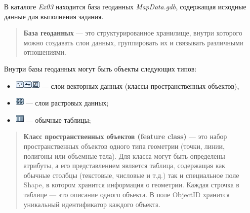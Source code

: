\documentclass[]{book}
\providecommand{\tightlist}{%
  \setlength{\itemsep}{0pt}\setlength{\parskip}{0pt}}
\theoremstyle{definition}
\theoremstyle{definition}
\theoremstyle{definition}
\theoremstyle{remark}
\begin{document}
В каталоге \emph{Ex03} находится база геоданных \emph{MapData.gdb},
содержащая исходные данные для выполнения задания.

\begin{quote}
\textbf{База геоданных} --- это структурированное хранилище, внутри
которого можно создавать слои данных, группировать их и связывать
различными отношениями.
\end{quote}

Внутри базы геоданных могут быть объекты следующих типов:

\begin{itemize}
\tightlist
\item
  \includegraphics{images/Ex03/image7.png}\includegraphics{images/Ex03/image8.png}\includegraphics{images/Ex03/image9.png}
  --- слои векторных данных (классы пространственных объектов),
\item
  \includegraphics{images/Ex03/image10.png} --- слои растровых данных;
\item
  \includegraphics{images/Ex03/image11.png} --- обычные таблицы;
\end{itemize}

\begin{quote}
\textbf{Класс пространственных объектов (feature class)} --- это набор
пространственных объектов одного типа геометрии (точки, линии, полигоны
или объемные тела). Для класса могут быть определены атрибуты, а его
представлением является таблица, содержащая как обычные столбцы
(текстовые, числовые и т.д.) так и специальное поле Shape, в котором
хранится информация о геометрии. Каждая строчка в таблице --- это
описание одного объекта. В поле ObjectID хранится уникальный
идентификатор каждого объекта.
\end{quote}
\end{document}
